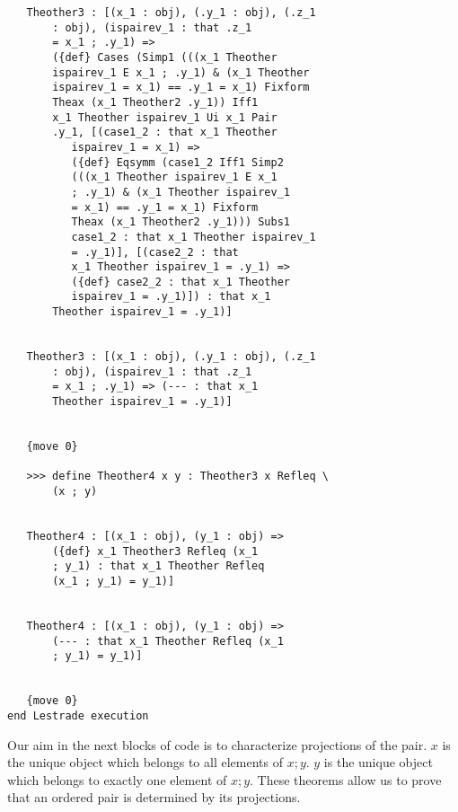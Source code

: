 \documentclass[12pt]{article}
\begin{document}
\begin{verbatim}
   Theother3 : [(x_1 : obj), (.y_1 : obj), (.z_1 
       : obj), (ispairev_1 : that .z_1 
       = x_1 ; .y_1) => 
       ({def} Cases (Simp1 (((x_1 Theother 
       ispairev_1 E x_1 ; .y_1) & (x_1 Theother 
       ispairev_1 = x_1) == .y_1 = x_1) Fixform 
       Theax (x_1 Theother2 .y_1)) Iff1 
       x_1 Theother ispairev_1 Ui x_1 Pair 
       .y_1, [(case1_2 : that x_1 Theother 
          ispairev_1 = x_1) => 
          ({def} Eqsymm (case1_2 Iff1 Simp2 
          (((x_1 Theother ispairev_1 E x_1 
          ; .y_1) & (x_1 Theother ispairev_1 
          = x_1) == .y_1 = x_1) Fixform 
          Theax (x_1 Theother2 .y_1))) Subs1 
          case1_2 : that x_1 Theother ispairev_1 
          = .y_1)], [(case2_2 : that 
          x_1 Theother ispairev_1 = .y_1) => 
          ({def} case2_2 : that x_1 Theother 
          ispairev_1 = .y_1)]) : that x_1 
       Theother ispairev_1 = .y_1)]


   Theother3 : [(x_1 : obj), (.y_1 : obj), (.z_1 
       : obj), (ispairev_1 : that .z_1 
       = x_1 ; .y_1) => (--- : that x_1 
       Theother ispairev_1 = .y_1)]


   {move 0}

   >>> define Theother4 x y : Theother3 x Refleq \
       (x ; y)


   Theother4 : [(x_1 : obj), (y_1 : obj) => 
       ({def} x_1 Theother3 Refleq (x_1 
       ; y_1) : that x_1 Theother Refleq 
       (x_1 ; y_1) = y_1)]


   Theother4 : [(x_1 : obj), (y_1 : obj) => 
       (--- : that x_1 Theother Refleq (x_1 
       ; y_1) = y_1)]


   {move 0}
end Lestrade execution
\end{verbatim}

Our aim in the next blocks of code is to characterize projections of the pair.  $x$ is the unique object which belongs to all elements of $x;y$.  $y$ is the unique object which belongs to exactly one element of $x;y$.  These theorems allow us to prove that an ordered pair is determined by its projections.
\end{document}
